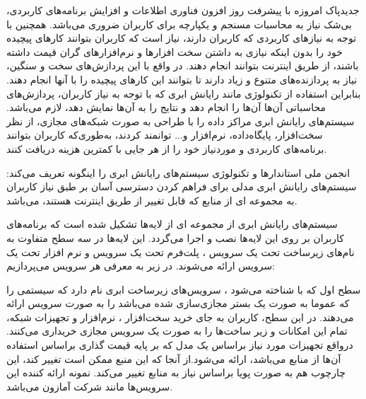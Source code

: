 ‌جدید‌پاک
 امروزه با پیشرفت روز افزون فناوری اطلاعات و افزایش برنامه‌های کاربردی، 
 بی‌شک نیاز به محاسبات مسنجم و یکپارچه برای کاربران ضروری می‌باشد.
 همچنین با توجه به نیازهای کاربردی که کاربران دارند، 
 نیاز است که کاربران بتوانند کارهای پیچیده خود را بدون  اینکه 
 نیازی به داشتن سخت افزارها و نرم‌افزارهای گران قیمت داشته باشند، 
 از طریق اینترنت بتوانند انجام دهند. در واقع با این پردازش‌های سخت و سنگین، 
 نیاز به پردازنده‌های متنوع و زیاد دارند تا بتوانند این کارهای پیچیده را با آنها انجام دهند. بنابراین استفاده از تکنولوژی مانند رایانش ابری که با توجه به نیاز کاربران، پردازش‌های محاسباتی آن‌ها آن‌ها را انجام دهد و نتایج را به آن‌ها 
 نمایش دهد، لازم می‌باشد. سیستم‌های رایانش ابری مراکز داده را با طراحی به صورت شبکه‌های مجازی، از نظر سخت‌افزار، پایگاه‌داده، نرم‌افزار و... توانمند کردند، 
 به‌طوری‌که کاربران بتوانند برنامه‌های کاربردی و موردنیاز خود را از هر جایی  با کمترین هزینه دریافت کنند.
  \cite{define,num2}
  
  انجمن ملی استاندارها و تکنولوژی سیستم‌های رایانش ابری را اینگونه تعریف می‌کند: سیستم‌های رایانش ابری مدلی برای فراهم کردن دسترسی آسان بر طبق نیاز کاربران به مجموعه ای از منابع که قابل تغییر از طریق اینترنت هستند، می‌باشد.
  \cite{define}


   سیستم‌های رایانش ابری از مجموعه ای از لایه‌ها تشکیل شده است که برنامه‌های کاربران بر روی این لایه‌ها نصب و اجرا می‌گردد. این لایه‌ها در سه سطح متفاوت به نام‌های زیرساخت تحت یک سرویس
    ، پلت‌فرم تحت یک سرویس
     و نرم ‌افزار تحت یک سرویس
     ارائه می‌شوند. در زیر به معرفی هر سرویس می‌پردازیم:

 سطح اول که با 
 شناخته می‌شود ، سرویس‌های زیرساخت ابری نام دارد که سیستمی‌ را که عموما به صورت یک بستر مجازی‌سازی شده می‌باشد را به صورت سرویس ارائه می‌دهند. در این سطح، کاربران به جای خرید سخت‌افزار ، نرم‌افزار و تجهیزات شبکه، تمام این امکانات و زیر ساخت‌ها را به صورت یک سرویس مجازی خریداری می‌کنند. درواقع تجهیزات مورد نیاز براساس یک مدل که بر پایه قیمت گذاری براساس استفاده آن‌ها از منابع می‌باشد، ارائه می‌شود.از آنجا که این منبع ممکن است تغییر کند، این چارچوب هم به صورت پویا براساس نیاز به منابع تغییر می‌کند. نمونه ارائه کننده این سرویس‌ها مانند شرکت آمازون می‌باشد.
   
